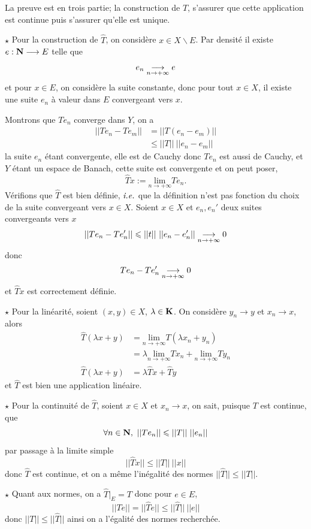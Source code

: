 \documentclass[a4paper,11pt, twoside]{article}
\begin{document}
\begin{Proof}
  La preuve est en trois partie; la construction de $\hat T$, s'assurer que cette application est continue puis s'assurer qu'elle est unique.

  $\star$ Pour la construction de $\hat T$, on considère $x\in X\backslash E$. Par densité il existe $e:\mathbf N\longrightarrow E$ telle que 
  $$e_n\underset{n\to+\infty}{\longrightarrow} e$$
  et pour $x\in E$, on considère la suite constante, donc pour tout $x\in X$, il existe une suite $e_n$ à valeur dans $E$ convergeant vers $x$.

  Montrons que $Te_n$ converge dans $Y$, on a 
  \begin{align*}
    ||Te_n-Te_m||&=||T(e_n-e_m)||\\
    &\leqslant ||T||\ ||e_n-e_m||
  \end{align*}
  la suite $e_n$ étant convergente, elle est de Cauchy donc $Te_n$ est aussi de Cauchy, et $Y$ étant un espace de Banach, cette suite est convergente et on peut poser, 
  $$\hat Tx:=\underset{n\to+\infty}{\mathrm{lim}}Te_n.$$
  Vérifions que $\hat T$ est bien définie, $\emph{i.e.}$ que la définition n'est pas fonction du choix de la suite convergeant vers $x\in X$. Soient $x\in X$ et $e_n,e_n'$ deux suites convergeants vers $x$
  $$||Te_n-Te_n'||\leqslant||t||\ ||e_n-e_n'||\tend0$$
  donc 
  $$Te_n-Te_n'\underset{n\to+\infty}{\longrightarrow} 0$$
  et $\hat Tx$ est correctement définie.

  $\star$ Pour la linéarité, soient $(x,y)\in X$, $\lambda\in\mathbf K$. On considère $y_n\longrightarrow y$ et $x_n\longrightarrow x$, alors
  \begin{align*}
    \hat T(\lambda x+y)&=\underset{n\to+\infty}{\mathrm{lim}}T(\lambda x_n+y_n)\\
    &=\lambda\underset{n\to+\infty}{\mathrm{lim}}Tx_n+\underset{n\to+\infty}{\mathrm{lim}}Ty_n\\
    \hat T(\lambda x+y)&=\lambda\hat Tx+\hat Ty
  \end{align*}
  et $\hat T$ est bien une application linéaire.

  $\star$ Pour la continuité de $\hat T$, soient $x\in X$ et $x_n\longrightarrow x$, on sait, puisque $T$ est continue, que 
  $$\forall n\in\N,\ ||Te_n||\leqslant ||T||\ ||e_n||$$
  par passage à la limite simple
  $$||\hat Tx||\leqslant ||T||\ ||x||$$
  donc $\hat T$ est continue, et on a même l'inégalité des normes $||\hat T||\leqslant ||T||$.

  $\star$ Quant aux normes, on a $\hat T\big|_E=T$ donc pour $e\in E$,
  $$||Te||=||\hat Te||\leqslant ||\hat T||\ ||e||$$
  donc $||T||\leqslant||\hat T||$ ainsi on a l'égalité des normes recherchée.


\end{Proof}
\end{document}
